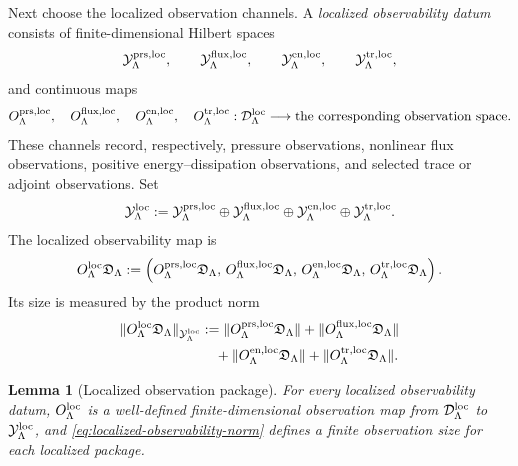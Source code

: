 \documentclass[11pt]{article}
\numberwithin{equation}{section}
\newtheorem{lemma}[theorem]{Lemma}
\begin{document}
Next choose the localized observation channels.  A \emph{localized
observability datum} consists of finite-dimensional Hilbert spaces
\[
        \mathcal Y_{\Lambda}^{\rm prs,loc},\qquad
        \mathcal Y_{\Lambda}^{\rm flux,loc},\qquad
        \mathcal Y_{\Lambda}^{\rm en,loc},\qquad
        \mathcal Y_{\Lambda}^{\rm tr,loc},
\]
and continuous maps
\[
        O_{\Lambda}^{\rm prs,loc},\quad
        O_{\Lambda}^{\rm flux,loc},\quad
        O_{\Lambda}^{\rm en,loc},\quad
        O_{\Lambda}^{\rm tr,loc}
        :
        \mathcal D_\Lambda^{\rm loc}
        \longrightarrow
        \text{the corresponding observation space}.
\]
These channels record, respectively, pressure observations, nonlinear flux
observations, positive energy--dissipation observations, and selected trace
or adjoint observations.  Set
\[
        \mathcal Y_\Lambda^{\rm loc}
        :=
        \mathcal Y_{\Lambda}^{\rm prs,loc}
        \oplus
        \mathcal Y_{\Lambda}^{\rm flux,loc}
        \oplus
        \mathcal Y_{\Lambda}^{\rm en,loc}
        \oplus
        \mathcal Y_{\Lambda}^{\rm tr,loc}.
\]
The localized observability map is
\begin{equation}\label{eq:localized-observability-map}
        O_\Lambda^{\rm loc}\mathfrak D_\Lambda
        :=
        \left(
        O_{\Lambda}^{\rm prs,loc}\mathfrak D_\Lambda,\,
        O_{\Lambda}^{\rm flux,loc}\mathfrak D_\Lambda,\,
        O_{\Lambda}^{\rm en,loc}\mathfrak D_\Lambda,\,
        O_{\Lambda}^{\rm tr,loc}\mathfrak D_\Lambda
        \right).
\end{equation}
Its size is measured by the product norm
\begin{equation}\label{eq:localized-observability-norm}
\begin{aligned}
        \|O_\Lambda^{\rm loc}\mathfrak D_\Lambda\|_{\mathcal Y_\Lambda^{\rm loc}}
        &:=
        \|O_{\Lambda}^{\rm prs,loc}\mathfrak D_\Lambda\|
        +
        \|O_{\Lambda}^{\rm flux,loc}\mathfrak D_\Lambda\|  \\
        &\quad+
        \|O_{\Lambda}^{\rm en,loc}\mathfrak D_\Lambda\|
        +
        \|O_{\Lambda}^{\rm tr,loc}\mathfrak D_\Lambda\|.
\end{aligned}
\end{equation}

\begin{lemma}[Localized observation package]\label{lem:localized-observation-package}
For every localized observability datum, \(O_\Lambda^{\rm loc}\) is a
well-defined finite-dimensional observation map from
\(\mathcal D_\Lambda^{\rm loc}\) to \(\mathcal Y_\Lambda^{\rm loc}\), and
\eqref{eq:localized-observability-norm} defines a finite observation size
for each localized package.
\end{lemma}
\end{document}
